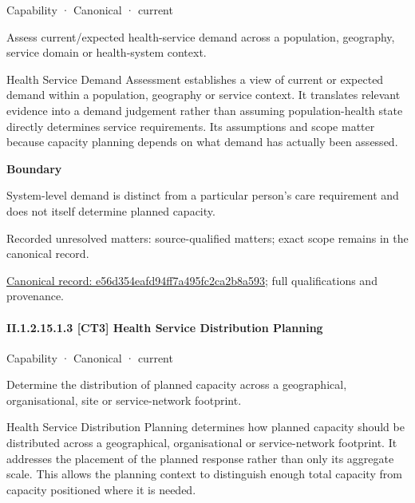 \label{element:e56d354eafd94ff7a495fc2ca2b8a593}
{\small Capability · Canonical · current}\par

Assess current/expected health-service demand across a population, geography, service domain or health-system context.



Health Service Demand Assessment establishes a view of current or expected demand within a population, geography or service context. It translates relevant evidence into a demand judgement rather than assuming population-health state directly determines service requirements. Its assumptions and scope matter because capacity planning depends on what demand has actually been assessed.



\textbf{Boundary}



System-level demand is distinct from a particular person's care requirement and does not itself determine planned capacity.


{\small Recorded unresolved matters: source-qualified matters; exact scope remains in the canonical record.}\par
{\footnotesize \href{../../../../../../../continuum/strategy/capability/e56d354eafd94ff7a495fc2ca2b8a593.md}{Canonical record: e56d354eafd94ff7a495fc2ca2b8a593}; full qualifications and provenance.}\par
\paragraph*{II.1.2.15.1.3 [CT3] Health Service Distribution Planning}
\label{navigation:II.1.2.15.1.3}

\label{element:4fc525fccbe142a58ee43dcc58b11c92}
{\small Capability · Canonical · current}\par

Determine the distribution of planned capacity across a geographical, organisational, site or service-network footprint.



Health Service Distribution Planning determines how planned capacity should be distributed across a geographical, organisational or service-network footprint. It addresses the placement of the planned response rather than only its aggregate scale. This allows the planning context to distinguish enough total capacity from capacity positioned where it is needed.



